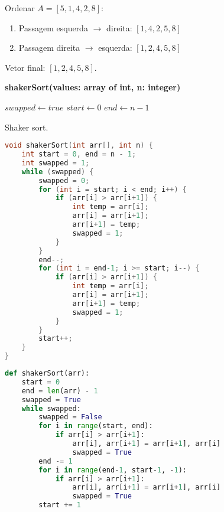 \begin{exmp}
Ordenar $A = [5, 1, 4, 2, 8]$:

\begin{enumerate}
    \item Passagem esquerda $\to$ direita: $[1, 4, 2, 5, 8]$
    \item Passagem direita $\to$ esquerda: $[1, 2, 4, 5, 8]$
\end{enumerate}
Vetor final: $[1, 2, 4, 5, 8]$.
\end{exmp}

\begin{center}
\begin{minipage}{.9\linewidth}
\begin{algorithm}[H]
\DontPrintSemicolon
\textbf{shakerSort(values: array of int, n: integer)}

$swapped \gets true$\;
$start \gets 0$\;
$end \gets n-1$\;

\caption{Shaker sort.}
\label{lab:alg-shakerSort}
\end{algorithm}
\end{minipage}
\end{center}

\begin{lstlisting}[language=C,caption={Shaker sort em C},captionpos=t]
void shakerSort(int arr[], int n) {
    int start = 0, end = n - 1;
    int swapped = 1;
    while (swapped) {
        swapped = 0;
        for (int i = start; i < end; i++) {
            if (arr[i] > arr[i+1]) {
                int temp = arr[i];
                arr[i] = arr[i+1];
                arr[i+1] = temp;
                swapped = 1;
            }
        }
        end--;
        for (int i = end-1; i >= start; i--) {
            if (arr[i] > arr[i+1]) {
                int temp = arr[i];
                arr[i] = arr[i+1];
                arr[i+1] = temp;
                swapped = 1;
            }
        }
        start++;
    }
}
\end{lstlisting}

\begin{lstlisting}[language=python,caption={Shaker sort em Python},captionpos=t]
def shakerSort(arr):
    start = 0
    end = len(arr) - 1
    swapped = True
    while swapped:
        swapped = False
        for i in range(start, end):
            if arr[i] > arr[i+1]:
                arr[i], arr[i+1] = arr[i+1], arr[i]
                swapped = True
        end -= 1
        for i in range(end-1, start-1, -1):
            if arr[i] > arr[i+1]:
                arr[i], arr[i+1] = arr[i+1], arr[i]
                swapped = True
        start += 1
\end{lstlisting}

